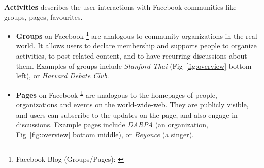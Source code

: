 


{\bf Activities} describes the user interactions with Facebook communities like groups, pages, favourites.
\begin{itemize}
\item \textbf{Groups} on Facebook 
\footnote{Facebook Blog (Groups/Pages): 
\label{fn:fbblog}}
are analogous to community organizations in the real-world. It allows users to declare membership and supports people to organize activities, to post related content, and to have recurring discussions about them. 
Examples of groups include {\em Stanford Thai} (Fig~\ref{fig:overview} bottom left), or {\em Harvard Debate Club}.
\item \textbf{Pages} on Facebook \textsuperscript{\ref{fn:fbblog}}
  are analogous to the homepages of people, organizations and events on the world-wide-web. 
  They are publicly visible, and users can subscribe to the updates on the page, and also engage in discussions. Example pages include {\em DARPA} (an organization, Fig~\ref{fig:overview} bottom middle), or {\em Beyonce} (a singer).

\end{itemize}
